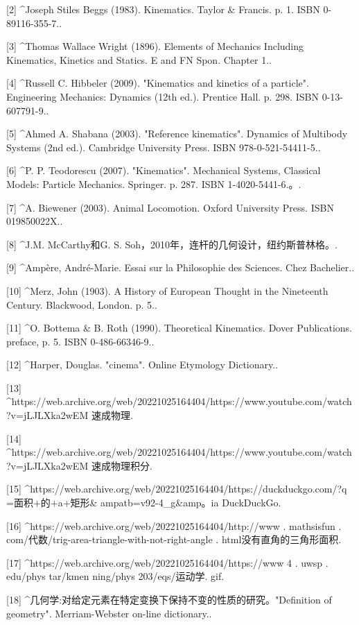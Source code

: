 [2]
^Joseph Stiles Beggs (1983). Kinematics. Taylor & Francis. p. 1. ISBN 0-89116-355-7..

[3]
^Thomas Wallace Wright (1896). Elements of Mechanics Including Kinematics, Kinetics and Statics. E and FN Spon. Chapter 1..

[4]
^Russell C. Hibbeler (2009). "Kinematics and kinetics of a particle". Engineering Mechanics: Dynamics (12th ed.). Prentice Hall. p. 298. ISBN 0-13-607791-9..

[5]
^Ahmed A. Shabana (2003). "Reference kinematics". Dynamics of Multibody Systems (2nd ed.). Cambridge University Press. ISBN 978-0-521-54411-5..

[6]
^P. P. Teodorescu (2007). "Kinematics". Mechanical Systems, Classical Models: Particle Mechanics. Springer. p. 287. ISBN 1-4020-5441-6.。.

[7]
^A. Biewener (2003). Animal Locomotion. Oxford University Press. ISBN 019850022X..

[8]
^J.M. McCarthy和G. S. Soh，2010年，连杆的几何设计，纽约斯普林格。.

[9]
^Ampère, André-Marie. Essai sur la Philosophie des Sciences. Chez Bachelier..

[10]
^Merz, John (1903). A History of European Thought in the Nineteenth Century. Blackwood, London. p. 5..

[11]
^O. Bottema & B. Roth (1990). Theoretical Kinematics. Dover Publications. preface, p. 5. ISBN 0-486-66346-9..

[12]
^Harper, Douglas. "cinema". Online Etymology Dictionary..

[13]
^https://web.archive.org/web/20221025164404/https://www.youtube.com/watch?v=jLJLXka2wEM 速成物理.

[14]
^https://web.archive.org/web/20221025164404/https://www.youtube.com/watch?v=jLJLXka2wEM 速成物理积分.

[15]
^https://web.archive.org/web/20221025164404/https://duckduckgo.com/?q =面积+的+a+矩形& ampatb=v92-4_g&amp。ia DuckDuckGo.

[16]
^https://web.archive.org/web/20221025164404/http://www . mathsisfun . com/代数/trig-area-triangle-with-not-right-angle . html没有直角的三角形面积.

[17]
^https://web.archive.org/web/20221025164404/https://www 4 . uwsp . edu/phys tar/kmen ning/phys 203/eqs/运动学. gif.

[18]
^几何学:对给定元素在特定变换下保持不变的性质的研究。"Definition of geometry". Merriam-Webster on-line dictionary..


